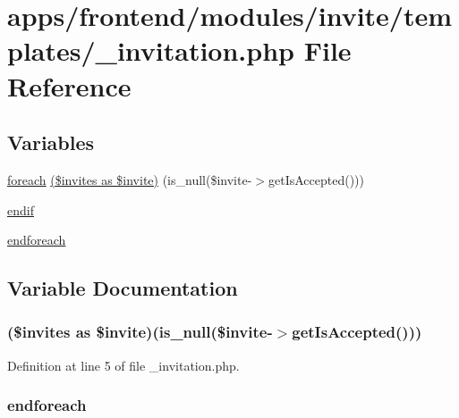 \hypertarget{__invitation_8php}{\section{apps/frontend/modules/invite/templates/\-\_\-invitation.php File Reference}
\label{__invitation_8php}
}
\subsection*{Variables}
\begin{DoxyCompactItemize}
\item 
\hyperlink{presse_2modules_2news_2templates_2index_success_8php_abc56db52b2e9a59bcd5c9e45ac5cb332}{foreach} \hyperlink{__invitation_8php_a49ea97c2faaf5e838a49910e61a5756e}{(\$invites as \$invite)} (is\-\_\-null(\$invite-\/$>$get\-Is\-Accepted()))
\item 
\hyperlink{__invitation_8php_a82cd33ca97ff99f2fcc5e9c81d65251b}{endif}
\item 
\hyperlink{__invitation_8php_a672d9707ef91db026c210f98cc601123}{endforeach}
\end{DoxyCompactItemize}


\subsection{Variable Documentation}
\hypertarget{__invitation_8php_a49ea97c2faaf5e838a49910e61a5756e}{
\subsubsection[{(\$invites as \$invite)}]{ (\$invites as \$invite)(is\-\_\-null(\$invite-\/$>$get\-Is\-Accepted()))}}\label{__invitation_8php_a49ea97c2faaf5e838a49910e61a5756e}


Definition at line 5 of file \-\_\-invitation.\-php.

\hypertarget{__invitation_8php_a672d9707ef91db026c210f98cc601123}{
\subsubsection[{endforeach}]{\setlength{\rightskip}{0pt plus 5cm}endforeach}}\label{__invitation_8php_a672d9707ef91db026c210f98cc601123}


